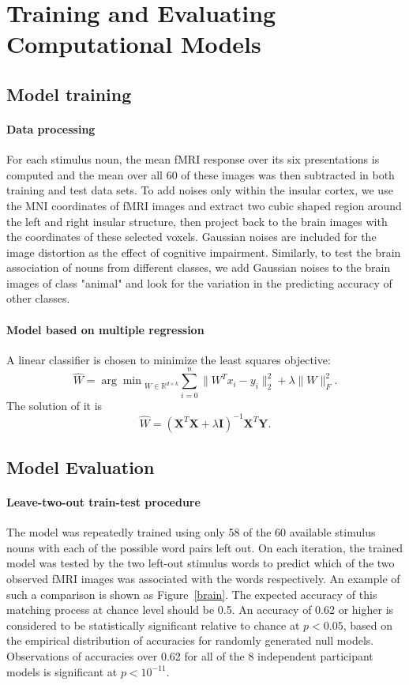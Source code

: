 \documentclass{article}
\begin{document}
\section{Training and Evaluating Computational Models}
\subsection{Model training}
\paragraph{Data processing} For each stimulus noun, the mean fMRI response over its six presentations is computed and the mean over all 60 of these images was then subtracted in both training and test data sets. To add noises only within the insular cortex, we use the MNI coordinates of fMRI images and extract two cubic shaped region around the left and right insular structure, then project back to the brain images with the coordinates of these selected voxels. Gaussian noises are included for the image distortion as the effect of cognitive impairment. Similarly, to test the brain association of nouns from different classes, we add Gaussian noises to the brain images of class "animal" and look for the variation in the predicting accuracy of other classes. 

\paragraph{Model based on multiple regression}
A linear classifier is chosen to minimize the least squares objective:
\begin{equation}
\hat{W}={\arg\min}_{W\in\mathbb{R}^{d\times k}}\sum_{i=0}^{n}\|W^{T}x_{i}-y_{i}\|^{2}_{2}+\lambda\|W\|^{2}_{F}.
\end{equation}
The solution of it is
\begin{equation}
\hat{W}=(\mathbf{X}^{T}\mathbf{X}+\lambda\mathbf{I})^{-1}\mathbf{X}^{T}\mathbf{Y}.
\end{equation}

\subsection{Model Evaluation}
\paragraph{Leave-two-out train-test procedure} The model was repeatedly trained using only 58 of the 60 available stimulus nouns with each of the possible word pairs left out. On each iteration, the trained model was tested by
the two left-out stimulus words to predict which of the two observed fMRI images was associated with the words respectively. An example of such a comparison is shown as Figure~\ref{brain}. The expected accuracy of this matching process at chance level should be 0.5. An accuracy of 0.62 or higher is considered to be statistically significant relative to chance at $p<0.05$, based on the empirical distribution of accuracies for randomly generated null models. Observations of accuracies over 0.62 for all of the 8 independent participant models is significant at $p<10^{-11}$. 
\end{document}
